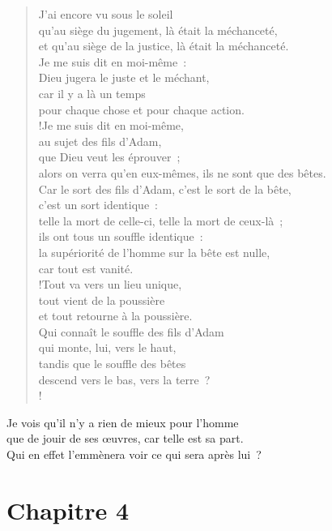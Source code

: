 \documentclass[french,twoside]{book} %
\def\mednobreak{\ifdim\lastskip<\medskipamount
  \removelastskip\nopagebreak\medskip\fi}
\newcommand{\labelblock}[1]{\medbreak{\noindent\color{rubric}\bfseries #1}\par\mednobreak}
\begin{document}
\labelblock{Justice et rétribution}


\begin{verse}
J’ai encore vu sous le soleil \\
qu’au siège du jugement, là était la méchanceté, \\
et qu’au siège de la justice, là était la méchanceté.\\
Je me suis dit en moi-même : \\
Dieu jugera le juste et le méchant, \\
car il y a là un temps \\
pour chaque chose et pour chaque action.\\!Je me suis dit en moi-même, \\
au sujet des fils d’Adam, \\
que Dieu veut les éprouver ; \\
alors on verra qu’en eux-mêmes, ils ne sont que des bêtes.\\
Car le sort des fils d’Adam, c’est le sort de la bête, \\
c’est un sort identique : \\
telle la mort de celle-ci, telle la mort de ceux-là ; \\
ils ont tous un souffle identique : \\
la supériorité de l’homme sur la bête est nulle, \\
car tout est vanité.\\!Tout va vers un lieu unique, \\
tout vient de la poussière \\
et tout retourne à la poussière.\\
Qui connaît le souffle des fils d’Adam \\
qui monte, lui, vers le haut, \\
tandis que le souffle des bêtes \\
descend vers le bas, vers la terre ?\\!
\end{verse}
Je vois qu’il n’y a rien de mieux pour l’homme \\
que de jouir de ses œuvres, car telle est sa part. \\
Qui en effet l’emmènera voir ce qui sera après lui ?\\
\section[{Chapitre 4}]{Chapitre 4}\renewcommand{\leftmark}{Chapitre 4}
\end{document}
